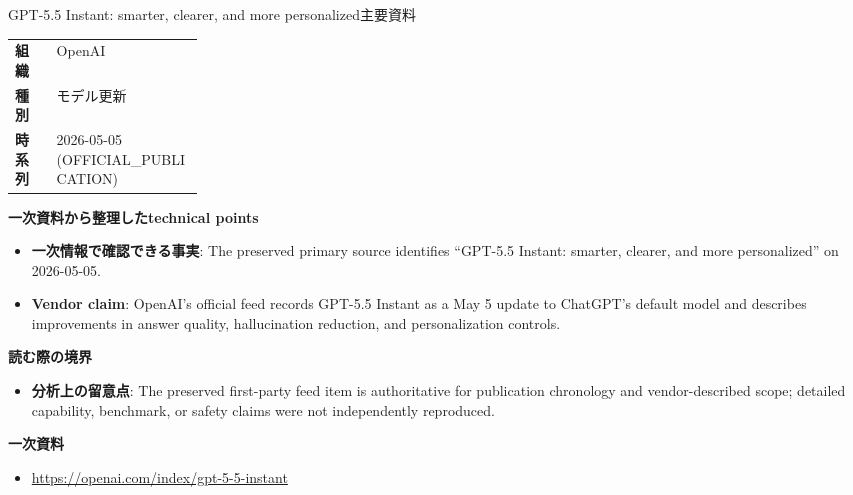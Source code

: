 \begin{technicalnote}{GPT-5.5 Instant: smarter, clearer, and more personalized}{主要資料}
\begin{tabularx}{\linewidth}{@{}>{\bfseries}p{0.22\linewidth}X@{}}
組織 & OpenAI \\
種別 & モデル更新 \\
時系列 & 2026-05-05 (OFFICIAL\_PUBLICATION) \\
\end{tabularx}
\smallskip
{\bfseries 一次資料から整理したtechnical points}
\begin{itemize}[leftmargin=1.5em,itemsep=0.35em]
\item \textbf{一次情報で確認できる事実}: The preserved primary source identifies “GPT-5.5 Instant: smarter, clearer, and more personalized” on 2026-05-05.
\item \textbf{Vendor claim}: OpenAI's official feed records GPT-5.5 Instant as a May 5 update to ChatGPT's default model and describes improvements in answer quality, hallucination reduction, and personalization controls.
\end{itemize}
{\bfseries 読む際の境界}
\begin{itemize}[leftmargin=1.5em,itemsep=0.35em]
\item \textbf{分析上の留意点}: The preserved first-party feed item is authoritative for publication chronology and vendor-described scope; detailed capability, benchmark, or safety claims were not independently reproduced.
\end{itemize}
{\bfseries 一次資料}
\begingroup\sloppy
\begin{itemize}[leftmargin=1.5em,itemsep=0.25em]
\item {\scriptsize\url{https://openai.com/index/gpt-5-5-instant}}
\end{itemize}
\endgroup
\end{technicalnote}
\medskip


